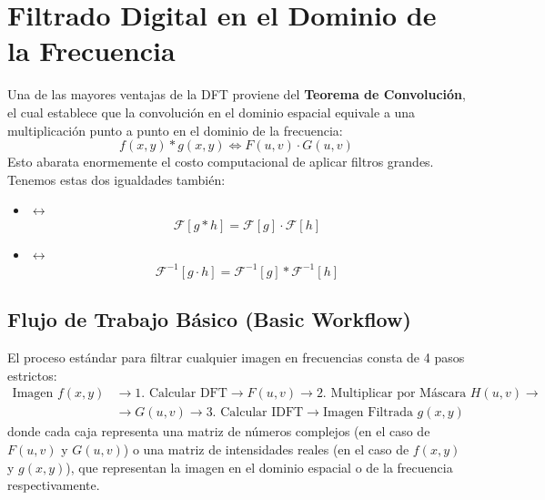 

\section{Filtrado Digital en el Dominio de la Frecuencia}
Una de las mayores ventajas de la DFT proviene del \textbf{Teorema de Convolución}, el cual establece que la convolución en el dominio espacial equivale a una multiplicación punto a punto en el dominio de la frecuencia:
$$f(x,y) * g(x,y) \iff F(u,v) \cdot G(u,v)$$
Esto abarata enormemente el costo computacional de aplicar filtros grandes. \\

\noindent
Tenemos estas dos igualdades también:
\begin{itemize}
    \item {} $\leftrightarrow$ 
    $$\mathcal{F}[g * h] = \mathcal{F}[g] \cdot \mathcal{F}[h]$$
    \item {} $\leftrightarrow$ 
    $$\mathcal{F}^{-1}[g \cdot h] = \mathcal{F}^{-1}[g] * \mathcal{F}^{-1}[h]$$
\end{itemize}

\subsection{Flujo de Trabajo Básico (Basic Workflow)}
\noindent
El proceso estándar para filtrar cualquier imagen en frecuencias consta de 4 pasos estrictos:
\begin{align*}
    \boxed{\text{Imagen } f(x,y)} &\longrightarrow \text{1. Calcular DFT} \longrightarrow \boxed{F(u,v)} \longrightarrow \text{2. Multiplicar por Máscara } H(u,v) \longrightarrow \\
    &\longrightarrow \boxed{G(u,v)} \longrightarrow \text{3. Calcular IDFT} \longrightarrow \boxed{\text{Imagen Filtrada } g(x,y)}
\end{align*}
donde cada caja representa una matriz de números complejos (en el caso de $F(u,v)$ y $G(u,v)$) o una matriz de intensidades reales (en el caso de $f(x,y)$ y $g(x,y)$), que representan la imagen en el dominio espacial o de la frecuencia respectivamente. \\

